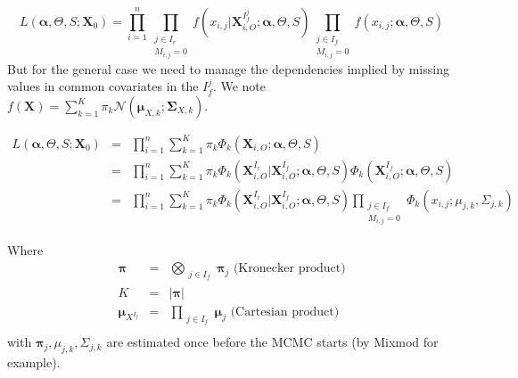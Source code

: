 \documentclass[11pt,a4paper]{report}
\begin{document}
		\begin{equation}
		L(\boldsymbol{\alpha},\Theta,S;\boldsymbol{X}_0)=\prod_{i=1}^n\prod_{\substack{j \in I_r \\ M_{i,j}=0}}f(x_{i,j}|\boldsymbol{X}^{I_f^j}_{i,O};\boldsymbol{\alpha},\Theta,S)\prod_{\substack{j \in I_f \\ M_{i,j}=0}}f(x_{i,j};\boldsymbol{\alpha},\Theta,S) \label{simplemisslik}
\end{equation}		 
		But for the general case we need to manage the dependencies implied by missing values in common covariates in the $I_f^j$.
		We note $f(\boldsymbol{X})=\sum_{k=1}^K\pi_k \mathcal{N}(\boldsymbol{\mu}_{X,k};\boldsymbol{\Sigma}_{X,k})$.
		
\begin{eqnarray}
L(\boldsymbol{\alpha},\Theta,S;\boldsymbol{X}_0)&=&\prod_{i=1}^n\sum_{k=1}^{K} \pi_{k} \Phi_k(\boldsymbol{X}_{i,O};\boldsymbol{\alpha},\Theta,S)\\
&=&\prod_{i=1}^n\sum_{k=1}^{K} \pi_{k} \Phi_k(\boldsymbol{X}_{i,O}^{I_r}|\boldsymbol{X}_{i,O}^{I_f};\boldsymbol{\alpha},\Theta,S)\Phi_k(\boldsymbol{X}_{i,O}^{I_f};\boldsymbol{\alpha},\Theta,S)\\
&=&\prod_{i=1}^n\sum_{k=1}^{K} \pi_{k} \Phi_k(\boldsymbol{X}_{i,O}^{I_r}|\boldsymbol{X}_{i,O}^{I_f};\boldsymbol{\alpha},\Theta,S)\prod_{\substack{j \in I_f \\ M_{i,j}=0}}\Phi_k(x_{i,j};\mu_{j,k},\Sigma_{j,k})
\end{eqnarray}		

Where	
\begin{eqnarray}
	\boldsymbol{\pi}&=&\bigotimes_{\substack{j \in I_f }} \boldsymbol{\pi}_j \textrm{ (Kronecker product)}\\
	K&=& |\boldsymbol{\pi}| \\
	\boldsymbol{\mu}_{X^{I_f}}&=&  \prod_{\substack{j \in I_f}}\boldsymbol{\mu}_{j} \textrm{ (Cartesian product) } \\	
\end{eqnarray}
		with $ \boldsymbol{\pi}_j, \mu_{j,k},\Sigma_{j,k}$ are estimated once before the MCMC starts (by Mixmod for example).
		
\end{document}
